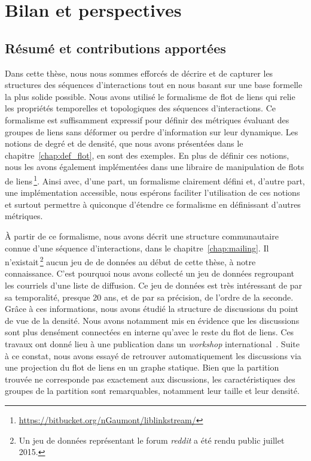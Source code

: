 \chapter{Bilan et perspectives}
\label{Conclusion}

\section{Résumé et contributions apportées}

Dans cette thèse, nous nous sommes efforcés de décrire et de capturer les structures des séquences d'interactions tout en nous basant sur une base formelle la plus solide possible.
Nous avons utilisé le formalisme de flot de liens qui relie les propriétés temporelles et topologiques des séquences d'interactions.
Ce formalisme est suffisamment expressif pour définir des métriques évaluant des groupes de liens sans déformer ou perdre d'information sur leur dynamique.
Les notions de degré et de densité, que nous avons présentées dans le chapitre~\ref{chap:def_flot}, en sont des exemples.
En plus de définir ces notions, nous les avons également implémentées dans une libraire de manipulation de flots de liens\,\footnote{\url{https://bitbucket.org/nGaumont/liblinkstream/}}.
Ainsi avec, d'une part, un formalisme clairement défini et, d'autre part, une implémentation accessible, nous espérons faciliter l'utilisation de ces notions et surtout permettre à quiconque d'étendre ce formalisme en définissant d'autres métriques.

\`A partir de ce formalisme, nous avons décrit une structure communautaire connue d'une séquence d'interactions, dans le chapitre~\ref{chap:mailing}.
Il n'existait\,\footnote{Un jeu de données représentant le forum \emph{reddit} a été rendu public juillet 2015.} aucun jeu de de données  au début de cette thèse, à notre connaissance.
C'est pourquoi nous avons collecté un jeu de données regroupant les courriels d'une liste de diffusion.
Ce jeu de données est très intéressant de par sa temporalité, presque 20 ans, et de par sa précision, de l'ordre de la seconde.
Grâce à ces informations, nous avons étudié la structure de discussions du point de vue de la densité.
Nous avons notamment mis en évidence que les discussions sont plus densément connectées en interne qu'avec le reste du flot de liens.
Ces travaux ont donné lieu à une publication dans un \emph{workshop} international~\cite{Gaumont2016}.
Suite à ce constat, nous avons essayé de retrouver automatiquement les discussions via une projection du flot de liens en un graphe statique.
Bien que la partition trouvée ne corresponde pas exactement aux discussions, les caractéristiques des groupes de la partition sont remarquables, notamment leur taille et leur densité.


